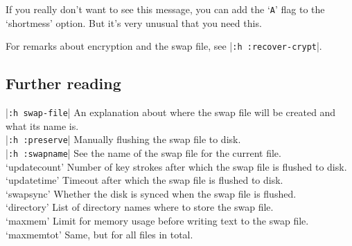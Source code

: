If you really don't want to see this message, you can add the `\verb!A!' flag to the `shortmess' option.
But it's very unusual that you need this.

For remarks about encryption and the swap file, see |\verb!:h :recover-crypt!|.

\subsection{Further reading}
|\verb!:h swap-file!|    An explanation about where the swap file will be created and what its name is. \\
|\verb!:h :preserve!|    Manually flushing the swap file to disk. \\
|\verb!:h :swapname!|    See the name of the swap file for the current file. \\
`updatecount'  Number of key strokes after which the swap file is flushed to disk. \\
`updatetime'    Timeout after which the swap file is flushed to disk. \\
`swapsync'    Whether the disk is synced when the swap file is flushed. \\
`directory'  List of directory names where to store the swap file. \\
`maxmem'    Limit for memory usage before writing text to the swap file. \\
`maxmemtot'  Same, but for all files in total. \\
\clearpage
